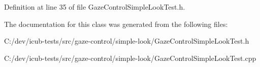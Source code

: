 Definition at line 35 of file Gaze\+Control\+Simple\+Look\+Test.\+h.



The documentation for this class was generated from the following files\+:\begin{DoxyCompactItemize}
\item 
C\+:/dev/icub-\/tests/src/gaze-\/control/simple-\/look/Gaze\+Control\+Simple\+Look\+Test.\+h\item 
C\+:/dev/icub-\/tests/src/gaze-\/control/simple-\/look/Gaze\+Control\+Simple\+Look\+Test.\+cpp\end{DoxyCompactItemize}

